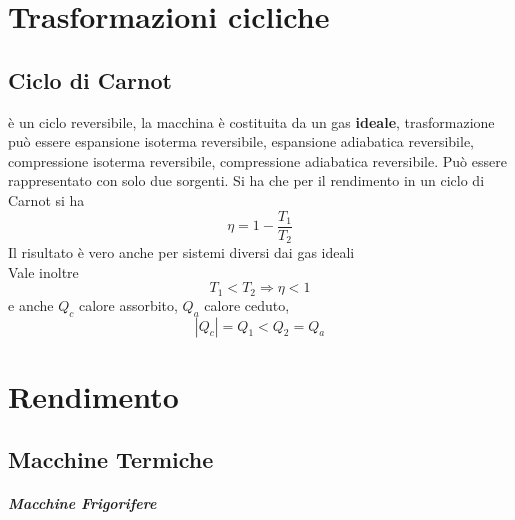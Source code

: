 \documentclass[a4paper]{report}
\begin{document}
  \section{Trasformazioni cicliche}
  \subsection{Ciclo di Carnot}
  è un ciclo reversibile, la macchina è costituita da un gas \textbf{ideale}, trasformazione può essere espansione isoterma reversibile, espansione adiabatica reversibile, compressione isoterma reversibile, compressione adiabatica reversibile. Può essere rappresentato con solo due sorgenti. Si ha che per il rendimento in un ciclo di Carnot si ha
  \[ \eta = 1 - \frac{T_1}{T_2}\]
  Il risultato è vero anche per sistemi diversi dai gas ideali \\
  Vale inoltre
  \[ T_1 < T_2 \Rightarrow \eta < 1 \]
  e anche $Q_c$ calore assorbito, $Q_a$ calore ceduto,
  \[ |Q_c| = Q_1 < Q_2 = Q_a \]

  \section{Rendimento}
  \subsection{Macchine Termiche}
  \subparagraph{Macchine Frigorifere}
\end{document}
